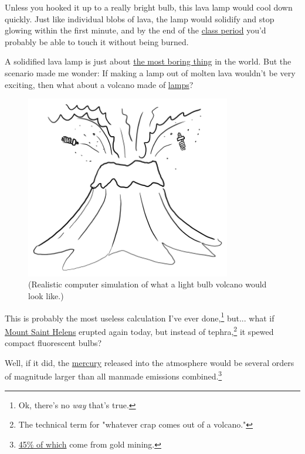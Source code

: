 {{Unless you hooked it up to a really bright bulb, this lava lamp would cool down quickly. Just like individual blobs of lava, the lamp would solidify and stop glowing within the first minute, and by the end of the \href{https://www.youtube.com/watch?v=Zf4wKY8PJtg}{class period} you'd probably be able to touch it without being burned.}

{A solidified lava lamp is just about \href{https://www.youtube.com/watch?v=TszHiC6fjDg}{the most boring thing} in the world. But the scenario made me wonder: If making a lamp out of molten lava wouldn't be very exciting, then what about a volcano made of \href{https://www.youtube.com/watch?v=7V2\_aMG3YsI} {lamps}?}

\begin{figure}[!htbp]
\centering
\includegraphics[scale=0.5, max width=0.8\textwidth]{imgs/a/122/volcano.png}
\caption{(Realistic computer simulation of what a light bulb volcano would look like.)}
\end{figure}

{This is probably the most useless calculation I've ever done,{\footnote{Ok, there's no \emph{way} that's true.} } but... what if \href{https://www.youtube.com/watch?v=Jxvisqt-U-8}{Mount Saint Helens} erupted again today, but instead of tephra,{\footnote{The technical term for "whatever crap comes out of a volcano."} } it spewed compact fluorescent bulbs?}

{Well, if it did, the \href{https://www.youtube.com/watch?v=cFvijBpzD\_Y}{mercury} released into the atmosphere would be several orders of magnitude larger than all manmade emissions combined.{\footnote{ \href{http://www.chem.unep.ch/mercury/Atmospheric\_Emissions/UNEP\%20SUMMARY\%20REPORT\%20-\%20CORRECTED\%20May09\%20\%20final\%20for\%20WEB\%202008.pdf}{45\% of which} come from gold mining.} } }

}
